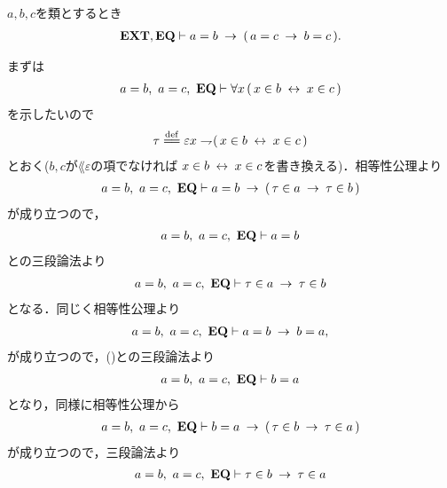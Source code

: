 	\begin{screen}
		\begin{thm}[等号の推移律]\label{thm:transitive_law_of_equality}
			$a,b,c$を類とするとき
			\begin{align}
				\mbox{{\bf EXT}},\mbox{{\bf EQ}} \vdash a = b \hspace{0.25em}\rightarrow\hspace{0.25em} (\, a = c \hspace{0.25em}\rightarrow\hspace{0.25em} b = c\, ).
			\end{align}
		\end{thm}
	\end{screen}
	
	\begin{sketch}
		まずは
		\begin{align}
			a = b,\ a = c,\ \mbox{{\bf EQ}} \vdash \forall x\, (\, x \in b \hspace{0.25em}\leftrightarrow\hspace{0.25em} x \in c\, )
		\end{align}
		を示したいので
		\begin{align}
			\tau \defeq \varepsilon x \negation (\, x \in b \lrarrow x \in c\, )
		\end{align}
		とおく($b,c$が$\lang{\varepsilon}$の項でなければ
		$x \in b \hspace{0.25em}\leftrightarrow\hspace{0.25em} x \in c$を書き換える)．相等性公理より
		\begin{align}
			a = b,\ a = c,\ \mbox{{\bf EQ}} \vdash a = b \hspace{0.25em}\rightarrow\hspace{0.25em} (\, \tau \in a \hspace{0.25em}\rightarrow\hspace{0.25em} \tau \in b\, )
		\end{align}
		が成り立つので，
		\begin{align}
			a = b,\ a = c,\ \mbox{{\bf EQ}} \vdash a = b
			\label{fom:thm_transitive_law_of_equality_0}
		\end{align}
		との三段論法より
		\begin{align}
			a = b,\ a = c,\ \mbox{{\bf EQ}} \vdash \tau \in a \hspace{0.25em}\rightarrow\hspace{0.25em} \tau \in b
			\label{fom:thm_transitive_law_of_equality_1}
		\end{align}
		となる．同じく相等性公理より
		\begin{align}
			a = b,\ a = c,\ \mbox{{\bf EQ}} \vdash a = b \hspace{0.25em}\rightarrow\hspace{0.25em} b = a, \\
		\end{align}
		が成り立つので，()との三段論法より
		\begin{align}
			a = b,\ a = c,\ \mbox{{\bf EQ}} \vdash b = a
		\end{align}
		となり，同様に相等性公理から
		\begin{align}
			a = b,\ a = c,\ \mbox{{\bf EQ}} \vdash b = a \hspace{0.25em}\rightarrow\hspace{0.25em} (\, \tau \in b \hspace{0.25em}\rightarrow\hspace{0.25em} \tau \in a\, )
		\end{align}
		が成り立つので，三段論法より
		\begin{align}
			a = b,\ a = c,\ \EQAX \vdash \tau \in b \rarrow \tau \in a
			\label{fom:thm_transitive_law_of_equality_2}

\end{align}
\end{sketch}
